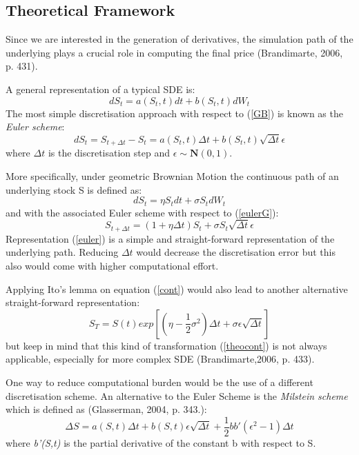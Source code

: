 \documentclass[a4paper,11pt]{article}
\begin{document}
\subsection{Theoretical Framework}
Since we are interested in the generation of derivatives, the simulation path of the underlying plays a crucial role in computing the final price (Brandimarte, 2006, p. 431).

A general representation of a typical SDE is:
\begin{equation}
dS_t=a(S_t,t)dt + b(S_t,t)dW_t
\label{GB}
\end{equation}
The most simple discretisation approach with respect to (\ref{GB}) is known as the \textit{Euler scheme}: 
\begin{equation}
dS_t=S_{t+\Delta t} - S_t= a(S_t,t)\Delta t +b(S_t,t)\sqrt{\Delta t} \epsilon
\label{eulerG}
\end{equation}
where $\Delta t$ is the discretisation step and $\epsilon \sim \mathbf{N} (0,1)$. 

More specifically, under geometric Brownian Motion the continuous path of an underlying stock S is defined as:
\begin{equation}
dS_t=\eta S_t dt + \sigma S_t dW_t
\label{cont}
\end{equation}
and with the associated Euler scheme with respect to (\ref{eulerG}):
\begin{equation}
S_{t+\Delta t}=(1+ \eta \Delta t) S_t + \sigma S_t \sqrt{\Delta t}\epsilon
\label{euler}
\end{equation}
Representation (\ref{euler}) is a simple and straight-forward representation of the underlying path. Reducing $\Delta t$ would decrease the discretisation error but this also would come with higher computational effort.

Applying Ito's lemma on equation (\ref{cont}) would also lead to another alternative straight-forward representation:
\begin{equation}
S_T= S(t) exp[(\eta - \dfrac{1}{2} \sigma^2)\Delta t+\sigma \epsilon \sqrt{\Delta t}]
\label{theocont}
\end{equation}
but keep in mind that this kind of transformation (\ref{theocont}) is not always applicable, especially for more complex SDE (Brandimarte,2006, p. 433).

One way to reduce computational burden would be the use of a different discretisation scheme. An alternative to the Euler Scheme is the  \textit{Milstein scheme} which is defined as (Glasserman, 2004, p. 343.):
\begin{equation}
\Delta S= a(S,t)\Delta t + b(S,t)\epsilon\sqrt{\Delta t} + \dfrac{1}{2}bb'(\epsilon^2 -1)\Delta t
\label{milsteintheo}
\end{equation}
where \textit{b'(S,t)} is the partial derivative of the constant b with respect to S. 
\end{document}
